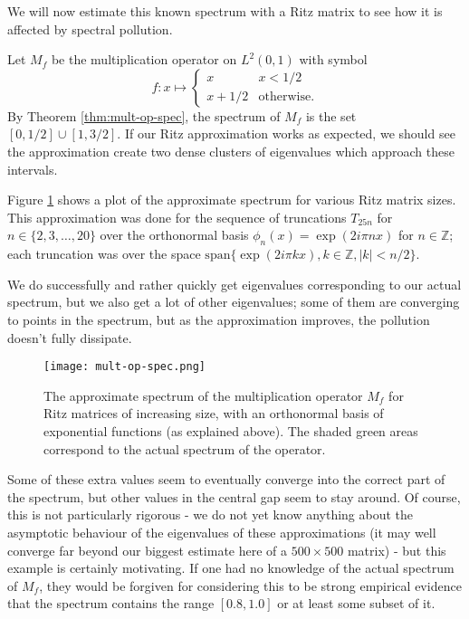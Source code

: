 \documentclass[../main.tex]{subfiles}
\begin{document}
We will now estimate this known spectrum with a Ritz matrix to see how
it is affected by spectral pollution.

\begin{example}
Let $M_f$ be the multiplication operator on $L^2(0, 1)$ with symbol
$$
f: x \mapsto \begin{cases}
x & x < 1/2 \\
x + 1/2 & \text{otherwise.}
\end{cases}
$$
By Theorem \ref{thm:mult-op-spec}, the spectrum of $M_f$ is the set $[0, 1/2]
\cup [1, 3/2]$. If our Ritz approximation works as expected, we should
see the approximation create two dense clusters of eigenvalues which
approach these intervals.
\end{example}

Figure \ref{fig:mult-op-spec} shows a plot of the approximate spectrum for
various Ritz matrix sizes. This approximation was done for the sequence of
truncations $T_{25n}$ for $n \in \{2, 3, \hdots, 20\}$ over the orthonormal
basis $\phi_n(x) = \exp(2 i \pi n x)$ for $n \in \mathbb{Z}$; each truncation
was over the space $\mathrm{span}\{\exp(2 i \pi k x), k \in \mathbb{Z}, |k| < n/2\}$.

We do successfully and rather quickly get eigenvalues corresponding to our
actual spectrum, but we also get a lot of other eigenvalues; some of them are
converging to points in the spectrum, but as the approximation improves, the
pollution doesn't fully dissipate.

\begin{figure}[h]
\centering
\texttt{[image: mult-op-spec.png]}
\caption{The approximate spectrum of the multiplication operator $M_f$ for Ritz
	matrices of increasing size, with an orthonormal basis of exponential
  functions (as explained above).
  The shaded green areas correspond to the
	actual spectrum of the operator.}
\label{fig:mult-op-spec}	
\end{figure}

Some of these extra values seem to eventually converge into the correct part of
the spectrum, but other values in the central gap seem to stay around.
Of course, this is not particularly rigorous - we do not yet know anything about
the asymptotic behaviour of the eigenvalues of these approximations (it may well
converge far beyond our biggest estimate here of a $500 \times 500$ matrix) -
but this example is certainly motivating. If one had no knowledge of the actual
spectrum of $M_f$, they would be forgiven for considering this to be strong
empirical evidence that the spectrum contains the range $[0.8, 1.0]$ or at least
some subset of it.
\end{document}
